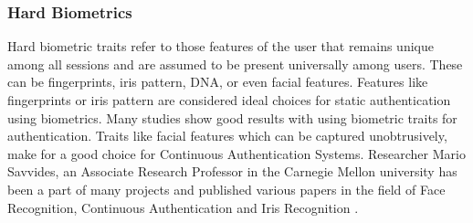 \documentclass[12pt]{article}			%
\begin{document}
\subsubsection{ Hard Biometrics}
Hard biometric traits refer to those features of the user that remains unique among all sessions and are assumed to be present universally among users. These can be fingerprints, iris pattern, DNA, or even facial features. Features like fingerprints or iris pattern are considered ideal choices for static authentication using biometrics. Many studies \cite{war02,john03,way97,kang06} show good results with using biometric traits for authentication. Traits like facial features which can be captured unobtrusively, make for a good choice for Continuous Authentication Systems. Researcher Mario Savvides, an Associate Research Professor in the Carnegie Mellon university has been a part of many projects and published various papers in the field of Face Recognition, Continuous Authentication and Iris Recognition \cite{marsav}. 
\end{document}

